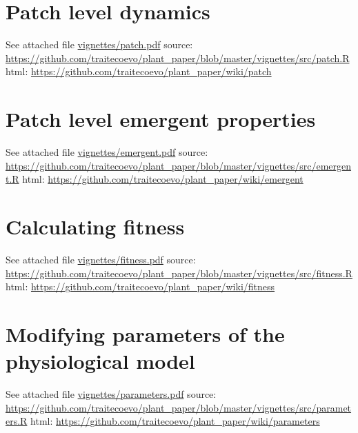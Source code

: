 \documentclass[a4paper,11pt]{article}
\newcommand{\smurl}[1]{{\footnotesize\url{#1}}}
\begin{document}
\begin{appendices}
\section{Patch level dynamics}\label{sec:patch}

See attached file \url{vignettes/patch.pdf}
source:
\smurl{https://github.com/traitecoevo/plant\_paper/blob/master/vignettes/src/patch.R}
html: \smurl{https://github.com/traitecoevo/plant\_paper/wiki/patch}

\section{Patch level emergent properties}\label{sec:emergent}

See attached file \url{vignettes/emergent.pdf}
source:
\smurl{https://github.com/traitecoevo/plant\_paper/blob/master/vignettes/src/emergent.R}
html: \smurl{https://github.com/traitecoevo/plant\_paper/wiki/emergent}

\section{Calculating fitness}\label{sec:fitness}

See attached file \url{vignettes/fitness.pdf}
source:
\smurl{https://github.com/traitecoevo/plant\_paper/blob/master/vignettes/src/fitness.R}
html: \smurl{https://github.com/traitecoevo/plant\_paper/wiki/fitness}

\section{Modifying parameters of the physiological model}\label{sec:parameters}
See attached file \url{vignettes/parameters.pdf}
source:
\smurl{https://github.com/traitecoevo/plant\_paper/blob/master/vignettes/src/parameters.R}
html: \smurl{https://github.com/traitecoevo/plant\_paper/wiki/parameters}

\end{appendices}
\end{document}
